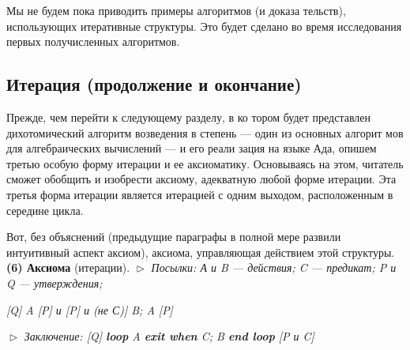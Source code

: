 Мы  не  будем  пока  приводить  примеры  алгоритмов   (и  доказа­
тельств),  использующих  итеративные  структуры.  Это  будет  сделано 
во время исследования первых получисленных алгоритмов.
\subsection{Итерация (продолжение и окончание)}
							\noindent Прежде,  чем  перейти  к  следующему  разделу,  в  ко­
							тором будет представлен дихотомический алгоритм 
							возведения в степень — один  из  основных алгорит­
							мов для алгебраических вычислений — и его реали­
							зация  на языке Ада, опишем третью особую форму 
							итерации и ее аксиоматику.  Основываясь на  этом,
читатель  сможет  обобщить  и  изобрести  аксиому,  адекватную  любой 
форме  итерации.  Эта  третья  форма  итерации  является  итерацией  с 
одним выходом, расположенным в середине цикла.

Вот, без объяснений (предыдущие параграфы в полной мере развили 
интуитивный  аспект  аксиом),  аксиома,  управляющая  действием  этой 
структуры.
\newline
\textbf{(6) Аксиома} (итерации).
\newline
$\vartriangleright$ \textit{Посылки: А и B --- действия; C --- предикат; P и Q --- утверждения;}
\begin{center}
\textit{[Q] A [P] и [P] и (не С)] B; A [P]}
\end{center}
$\vartriangleright$ \textit{Заключение:  \textit{[Q]} \textbf{loop} \textit{A} \textbf{exit when} \textit{C}; \textit{B} \textbf{end loop} \textit{[P и C]}}

